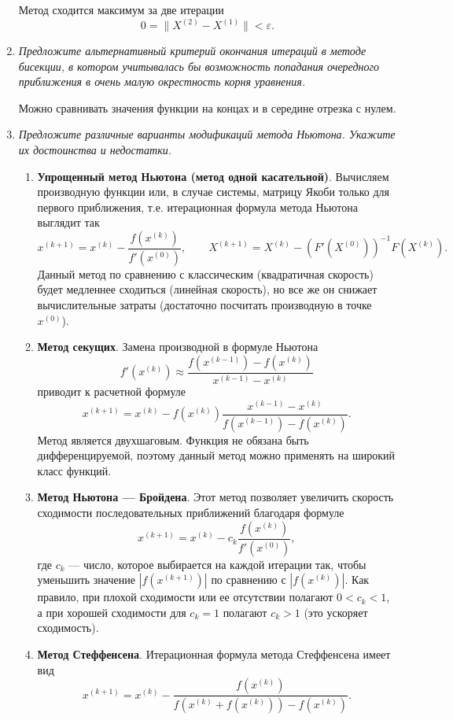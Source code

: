 \documentclass[12pt, a4paper]{article}
\begin{document}
\begin{enumerate}
		Метод сходится максимум за две итерации
		\[
		0 = \|X^{(2)} - X^{(1)}\|<\varepsilon.
		\]
		
		
		\item \textit{Предложите альтернативный критерий окончания итераций в методе бисекции, в котором учитывалась бы возможность попадания очередного приближения в очень малую окрестность корня уравнения.}
		\smallskip
		
		Можно сравнивать значения функции на концах и в середине отрезка с нулем.
		
		\item \textit{Предложите различные варианты модификаций метода Ньютона. Укажите их достоинства и недостатки.}
		\smallskip
		
		\begin{enumerate}
			\item \textbf{Упрощенный метод Ньютона (метод одной касательной)}. Вычисляем  производную функции или, в случае системы, матрицу Якоби только для первого приближения, т.е. итерационная формула метода Ньютона выглядит так
				\[
				x^{(k+1)} = x^{(k)}-\frac{f(x^{(k)})}{f'(x^{(0)})}, \qquad				
			X^{(k+1)} = X^{(k)}-(F'(X^{(0)}))^{-1}F(X^{(k)}).
			\]
			Данный метод по сравнению с классическим (квадратичная скорость) будет медленнее сходиться (линейная скорость), но все же он снижает вычислительные затраты (достаточно посчитать производную в точке $x^{(0)}$).
			\item \textbf{Метод секущих}. Замена производной в формуле Ньютона
			\[
			f'(x^{(k)}) \approx\frac{f(x^{(k-1)})-f(x^{(k)})}{x^{(k-1)} - x^{(k)}}
			\]  
			приводит к расчетной формуле
			\[
			x^{(k+1)} = x^{(k)}-f(x^{(k)})\frac{x^{(k-1)} - x^{(k)}}{f(x^{(k-1)})-f(x^{(k)})}.
			\]
			Метод является двухшаговым. Функция не обязана быть дифференцируемой, поэтому данный метод можно применять на широкий класс функций.
			\item \textbf{Метод Ньютона --- Бройдена}. Этот метод позволяет увеличить скорость сходимости последовательных приближений благодаря формуле
			\[
			x^{(k+1)} = x^{(k)}-c_k\frac{f(x^{(k)})}{f'(x^{(0)})},
			\]
			где $c_k$ --- число, которое выбирается на каждой итерации так, чтобы уменьшить значение $|f(x^{(k+1)})|$ по сравнению с $|f(x^{(k)})|$. Как правило, при плохой сходимости или ее отсутствии полагают $0<c_k<1$, а при хорошей сходимости для $c_k=1$ полагают $c_k>1$ (это ускоряет сходимость).
			\item \textbf{Метод Стеффенсена}. Итерационная формула метода Стеффенсена имеет вид
				\[
			x^{(k+1)} = x^{(k)}-\frac{f(x^{(k)})}{f(x^{(k)}+f(x^{(k)}))-f(x^{(k)})}.
\]
\end{enumerate}
\end{enumerate}
\end{document}
